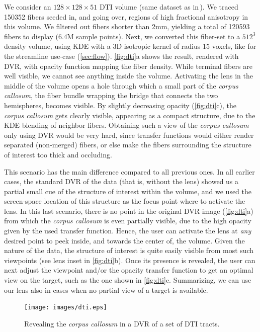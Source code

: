We consider an $128 \times 128 \times 51$ DTI volume (same dataset as in\,\cite{everts15}). We traced 150352 fibers seeded in, and going over, regions of high fractional anisotropy in this volume. We filtered out fibers shorter than 2mm, yielding a total of 120593 fibers to display (6.4M sample points). Next, we converted this fiber-set to a $512^3$ density volume, using KDE with a 3D isotropic kernel of radius 15 voxels, like for the streamline use-case (\autoref{sec:flow}). \autoref{fig:dti}a shows the result, rendered with DVR, with opacity function mapping the fiber density. While terminal fibers are well visible, we cannot see anything inside the volume. Activating the lens in the middle of the volume opens a hole through which a small part of the \emph{corpus callosum}, the fiber bundle wrapping the bridge that connects the two hemispheres, becomes visible. By slightly decreasing opacity (\autoref{fig:dti}c), the \emph{corpus callosum} gets clearly visible, appearing as a compact structure, due to the KDE blending of neighbor fibers. Obtaining such a view of the \emph{corpus callosum} only using DVR would be very hard, since transfer functions would either render separated (non-merged) fibers, or else make the fibers surrounding the structure of interest too thick and occluding. 

This scenario has the main difference compared to all previous ones. In all earlier cases, the standard DVR of the data (that is, without the lens) showed us a partial small cue of the structure of interest within the volume, and we used the screen-space location of this structure as the focus point where to activate the lens. In this last scenario, there is no point in the original DVR image (\autoref{fig:dti}a) from which the \emph{corpus callosum} is even partially visible, due to the high opacity given by the used transfer function. Hence, the user can activate the lens at \emph{any} desired point to peek inside, and towards the center of, the volume. Given the nature of the data, the structure of interest is quite easily visible from most such viewpoints (see lens inset in \autoref{fig:dti}b). Once its presence is revealed, the user can next adjust the viewpoint and/or the opacity transfer function to get an optimal view on the target, such as the one shown in \autoref{fig:dti}c. Summarizing, we can use our lens also in cases when no partial view of a target is available. 

\begin{figure}
\centering
\texttt{[image: images/dti.eps]}
\caption{Revealing the \emph{corpus callosum} in a DVR of a set of DTI tracts.}
\label{fig:dti}
\end{figure}

